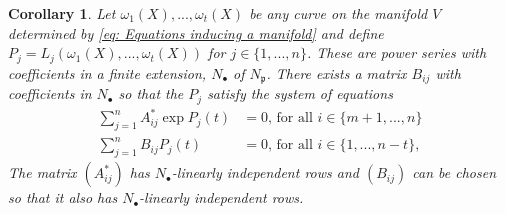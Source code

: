 \documentclass{article}
\newtheorem{corollary}{Corollary}[section]
\newcommand{\mfrak}[1]{\mathfrak{#1}}
\numberwithin{equation}{section}
\begin{document}
\begin{corollary}\label{cor: Any curve on V gives a solution to a system of equations}
    Let $\omega_1(X), ..., \omega_t(X)$ be any curve on the manifold $V$ determined by \cref{eq: Equations inducing a manifold} and define $P_j = L_j(\omega_1(X), ..., \omega_t(X))$ for $j \in \{1, ..., n\}$. These are power series with coefficients in a finite extension, $N_\bullet$ of $N_\mfrak p$. There exists a matrix $B_{ij}$ with coefficients in $N_\bullet$ so that the $P_j$ satisfy the system of equations
    \begin{equation}\label{eq: System that can also be solved}
        \begin{aligned}
            \sum_{j=1}^n A^*_{ij}\exp P_j(t) & = 0 \text{, for all } i \in \{ m+1, ..., n \} \\
            \sum_{j=1}^n B_{ij}P_j(t)        & = 0 \text{, for all } i \in \{1,  ..., n-t\},
        \end{aligned}
    \end{equation}
    The matrix $(A^*_{ij})$ has     $N_\bullet$-linearly independent rows and $(B_{ij})$ can be chosen so that it also has $N_\bullet$-linearly independent rows.
\end{corollary}
\end{document}
